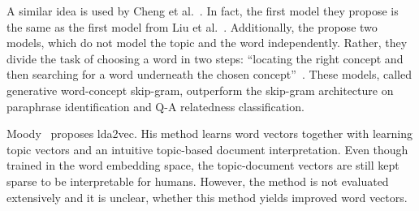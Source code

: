 \documentclass[
        a4paper,
        titlepage,
        twoside,
        parskip,
        numbers=noenddot
        ]{scrbook}
\theoremstyle{break}
\begin{document}
A similar idea is used by Cheng et al.~\cite{Cheng2015}.
In fact, the first model they propose is the same as the first model from Liu et al.~\cite{Liu2015}.
Additionally, the propose two models, which do not model the topic and the word independently.
Rather, they divide the task of choosing a word in two steps: ``locating the right concept and then searching for a word underneath the chosen concept''~\cite{Cheng2015}.
These models, called generative word-concept skip-gram, outperform the skip-gram architecture on paraphrase identification and Q-A relatedness classification.

Moody~\cite{Moody2016} proposes lda2vec.
His method learns word vectors together with learning topic vectors and an intuitive topic-based document interpretation.
Even though trained in the word embedding space, the topic-document vectors are still kept sparse to be interpretable for humans.
However, the method is not evaluated extensively and it is unclear, whether this method yields improved word vectors.




\end{document}
